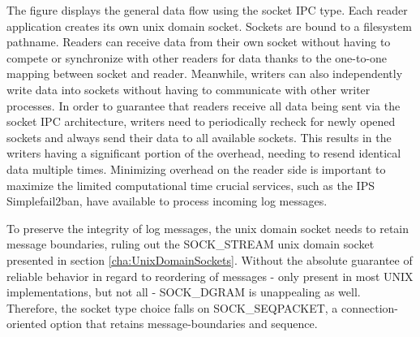 The figure displays the general data flow using the socket \ac{IPC} type.
Each reader application creates its own unix domain socket.
Sockets are bound to a filesystem pathname.
Readers can receive data from their own socket without having to compete or synchronize with other readers for data thanks to the one-to-one mapping between socket and reader.
Meanwhile, writers can also independently write data into sockets without having to communicate with other writer processes.
In order to guarantee that readers receive all data being sent via the socket \ac{IPC} architecture, writers need to periodically recheck for newly opened sockets and always send their data to all available sockets.
This results in the writers having a significant portion of the overhead, needing to resend identical data multiple times.
Minimizing overhead on the reader side is important to maximize the limited computational time crucial services, such as the \ac{IPS} Simplefail2ban, have available to process incoming log messages.

To preserve the integrity of log messages, the unix domain socket needs to retain message boundaries, ruling out the SOCK\_STREAM unix domain socket presented in section \ref{cha:UnixDomainSockets}.
Without the absolute guarantee of reliable behavior in regard to reordering of messages - only present in most UNIX implementations, but not all\cite{man:unixsockets} - SOCK\_DGRAM is unappealing as well.
Therefore, the socket type choice falls on SOCK\_SEQPACKET, a connection-oriented option that retains message-boundaries and sequence.